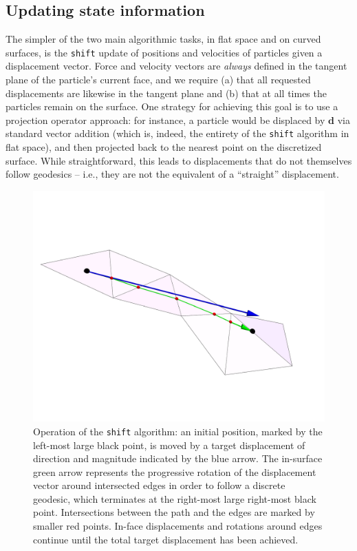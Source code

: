 \documentclass[preprint,12pt]{elsarticle}
\newcommand{\bs}[1]{\boldsymbol{#1}}
\newcounter{bla}
\begin{document}
\subsection{Updating state information}

The simpler of the two main algorithmic tasks, in flat space and on curved surfaces, is the \verb+shift+ update of positions and velocities of particles given a displacement vector. Force and velocity vectors are \emph{always} defined in the tangent plane of the particle's current face, and we require (a) that all requested displacements are likewise in the tangent plane and (b) that at all times the particles remain on the surface. One strategy for achieving this goal is to use a projection operator approach: for instance, a particle would be displaced by $\bs{d}$ via standard vector addition (which is, indeed, the entirety of the \verb+shift+ algorithm in flat space), and then projected back to the nearest point on the discretized surface. While straightforward, this leads to displacements that do not themselves follow geodesics -- i.e., they are not the equivalent of a ``straight'' displacement.

\begin{figure}[th]
    \centering
    \includegraphics[width = 1.0\columnwidth]{path_rotate_2.pdf}
    \caption{Operation of the \texttt{shift} algorithm: an initial position, marked by the left-most large black point, is moved by a target displacement of direction and magnitude indicated by the blue arrow. The in-surface green arrow represents the progressive rotation of the displacement vector around intersected edges in order to follow a discrete geodesic, which terminates at the right-most large right-most black point. Intersections between the path and the edges are marked by smaller red points. In-face displacements and rotations around edges continue until the total target displacement has been achieved.}
    \label{fig:wraparound_shift}
\end{figure}
\end{document}
